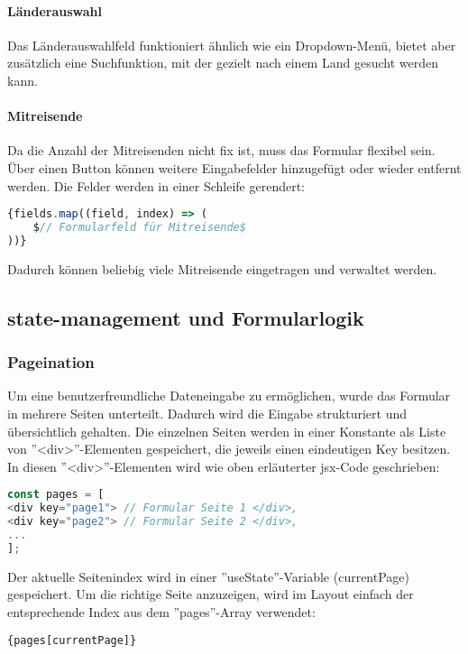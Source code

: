 \paragraph{Länderauswahl}
Das Länderauswahlfeld funktioniert ähnlich wie ein Dropdown-Menü, bietet aber zusätzlich eine Suchfunktion, mit der gezielt nach einem Land gesucht werden kann.

\paragraph{Mitreisende}
Da die Anzahl der Mitreisenden nicht fix ist, muss das Formular flexibel sein. Über einen Button können weitere Eingabefelder hinzugefügt oder wieder entfernt werden. Die Felder werden in einer Schleife gerendert:

\begin{lstlisting}[language=JavaScript]
{fields.map((field, index) => (
    $// Formularfeld für Mitreisende$
))}
\end{lstlisting}

Dadurch können beliebig viele Mitreisende eingetragen und verwaltet werden.

\subsection{\gls{state-management} und Formularlogik}

\subsubsection{Pageination}
Um eine benutzerfreundliche Dateneingabe zu ermöglichen, wurde das Formular in mehrere Seiten unterteilt. Dadurch wird die Eingabe strukturiert und übersichtlich gehalten. Die einzelnen Seiten werden in einer Konstante als Liste von ''<div>''-Elementen gespeichert, die jeweils einen eindeutigen Key besitzen. In diesen ''<div>''-Elementen wird wie oben erläuterter \gls{jsx}-Code geschrieben:
\begin{lstlisting}[language=JavaScript]
const pages = [
<div key="page1"> // Formular Seite 1 </div>,
<div key="page2"> // Formular Seite 2 </div>,
...
];
\end{lstlisting}

Der aktuelle Seitenindex wird in einer ''useState''-Variable (currentPage) gespeichert. Um die richtige Seite anzuzeigen, wird im Layout einfach der entsprechende Index aus dem ''pages''-Array verwendet:
\begin{lstlisting}[language=JavaScript]
{pages[currentPage]}
\end{lstlisting}

